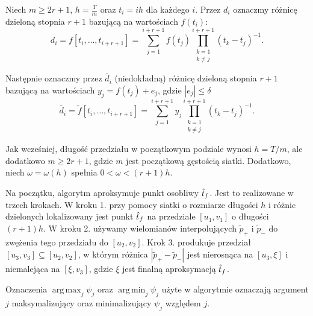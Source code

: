 \documentclass[oik, pdftex, robocza, man]{mgrwms}
\DeclareMathOperator*{\argmax}{arg\,max}
\DeclareMathOperator*{\argmin}{arg\,min}
\begin{document}
    Niech $m \geq 2r + 1$, $h = \frac{T}{m}$ oraz $t_{i} = ih$ dla każdego $i$. Przez $d_{i}$ oznaczmy różnicę dzieloną stopnia $r+1$ bazującą na wartościach $f(t_{i})$:
    \begin{equation} \label{eq:30:roznica_dzielna}
        d_{i} = f[t_{i}, \dots, t_{i+r+1}] = \sum_{j = 1}^{i+r+1} f(t_{j}) \prod_{\substack{k=1 \\ k \neq j}}^{i+r+1}(t_{k}-t_{j})^{-1}.
    \end{equation}

    Następnie oznaczmy przez $\tilde{d_i}$ (niedokładną) różnicę dzieloną stopnia $r+1$ bazującą na wartościach $y_{j} = f(t_{j}) + e_{j}$, gdzie $|e_{j}| \leq \delta$
    \begin{equation} \label{eq:31:niedokladna_roznica_dzielna}
        \tilde{d_{i}} = \tilde{f}[t_{i}, \dots, t_{i+r+1}] = \sum_{j = 1}^{i+r+1} y_{j} \prod_{\substack{k=1 \\ k \neq j}}^{i+r+1}(t_{k}-t_{j})^{-1}.
    \end{equation}

    Jak wcześniej, długość przedziału w początkowym podziale wynosi $h = T / m$, ale dodatkowo $m \geq 2r + 1$, gdzie $m$ jest początkową gęstością siatki. Dodatkowo, niech $\omega  = \omega(h)$ spełnia $0 < \omega < (r + 1)h $.

    Na początku, algorytm aproksymuje punkt osobliwy $\hat{t}_f$. Jest to realizowane w trzech krokach. W kroku 1. przy pomocy siatki o rozmiarze długości $h$ i różnic dzielonych lokalizowany jest punkt $\hat{t}_f$ na przedziale $[u_1, v_1]$ o długości $(r + 1)h$. W kroku 2. używamy wielomianów interpolujących $\tilde{p}_+$ i $\tilde{p}_-$ do zwężenia tego przedziału do $[u_2, v_2]$. Krok 3. produkuje przedział $[u_3, v_3] \subseteq [u_2, v_2]$, w którym różnica $|\tilde{p}_{+} - \tilde{p}_{-}|$ jest nierosnąca na $[u_3, \xi]$ i niemalejąca na $[\xi, v_3]$, gdzie $\xi$ jest finalną aproksymacją $\hat{t}_f$.

    Oznaczenia $\argmax_{j} \psi_{j}$ oraz $\argmin_{j} \psi_{j}$ użyte w algorytmie oznaczają argument $j$ maksymalizujący oraz minimalizujący $\psi_{j}$ względem $j$.
\end{document}
